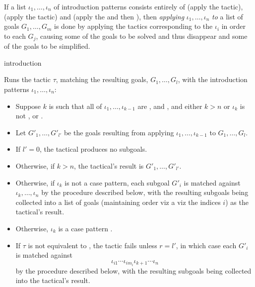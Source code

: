 If a list $\iota_1,\ldots,\iota_n$ of introduction patterns consists
entirely of \ec{//} (apply the  tactic), \ec{/=}
(apply the  tactic) and \ec{//=} (apply the
 and then ), then \emph{applying}
$\iota_1,\ldots,\iota_n$ \emph{to} a list of goals $G_1,\ldots,G_m$ is
done by applying the tactics corresponding to the $\iota_i$ in order
to each $G_j$, causing some of the goals to be solved and thus
disappear and some of the goals to be simplified.

\begin{tactic}[$\tau$=>$\;\iota_1 \cdots \iota_n$]{introduction}
  \begin{tsyntax}[empty]{}
    Runs the tactic $\tau$, matching the resulting goals, $G_1,\ldots,G_l$,
    with the introduction patterns $\iota_1,\ldots,\iota_n$:
    \begin{itemize}
    \item Suppose $k$ is such that all of $\iota_1,\ldots,\iota_{k-1}$
      are \ec{//}, \ec{/=} and \ec{//=}, and either $k>n$ or $\iota_k$
      is not \ec{//}, \ec{/=} or \ec{//=}.

    \item Let $G'_1,\ldots,G'_{l'}$ be the goals resulting from
      applying $\iota_1,\ldots,\iota_{k-1}$ to $G_1,\ldots,G_l$.

    \item If $l'=0$, the tactical produces no subgoals.

    \item Otherwise, if $k>n$, the tactical's result is
      $G'_1,\ldots,G'_{l'}$.

    \item Otherwise, if $\iota_k$ is not a case pattern, each subgoal
      $G'_i$ is matched against $\iota_k,\ldots,\iota_n$ by the
      procedure described below, with the resulting subgoals being
      collected into a list of goals (maintaining order viz a viz the
      indices $i$) as the tactical's result.

    \item Otherwise, $\iota_k$ is a case pattern
          .

     \item If $\tau$ is not equivalent to , the tactic fails
       unless $r = l'$, in which case each $G'_i$ is matched against 
        \begin{displaymath}
          \iota_{i1}\cdots\iota_{i{m_i}}\iota_{k+1}\cdots \iota_n
        \end{displaymath}
       by the procedure described below, with the resulting subgoals
       being collected into the tactical's result.


\end{itemize}
\end{tsyntax}
\end{tactic}
